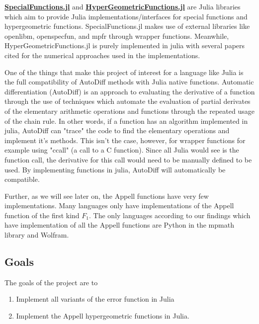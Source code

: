 \documentclass{article}
\theoremstyle{mytheoremstyle}
\theoremstyle{mytheoremstyle}
\theoremstyle{myproblemstyle}
\begin{document}
   \medskip
   \href{https://github.com/JuliaMath/SpecialFunctions.jl}{\textbf{SpecialFunctions.jl}} and \href{https://github.com/JuliaMath/HypergeometricFunctions.jl/issues}{\textbf{HyperGeometricFunctions.jl}} are Julia libraries which aim to provide Julia implementations/interfaces for special functions and hypergeometric functions.
   SpecialFunctions.jl makes use of external libraries like openlibm, openspecfun, and mpfr through wrapper functions.
   Meanwhile, HyperGeometricFunctions.jl is purely implemented in julia with several papers cited for the numerical approaches used in the implementations.

   \medskip
   One of the things that make this project of interest for a language like Julia is the full compatibility of AutoDiff methods with Julia native functions.
   Automatic differentiation (AutoDiff) is an approach to evaluating the derivative of a function through the use of techniques which automate the evaluation of partial derivates of the elementary arithmetic operations and functions through the repeated usage of the chain rule.\cite{autodiff, ForwardDiff.jl}
   In other words, if a function has an algorithm implemented in julia, AutoDiff can "trace" the code to find the elementary operations and implement it's methods. 
   This isn't the case, however, for wrapper functions for example using "ccall" (a call to a C function). 
   Since all Julia would see is the function call, the derivative for this call would need to be manually defined to be used.
   By implementing functions in julia, AutoDiff will automatically be compatible.

   \medskip
   Further, as we will see later on, the Appell functions have very few implementations. 
   Many languages only have implementations of the Appell function of the first kind $F_1$. 
   The only languages according to our findings which have implementation of all the Appell functions are Python in the mpmath\cite{mpmath hypergeometric} library and Wolfram\cite{wolfram hypergeometric}.

    
    \subsection*{Goals}\label{sub:Goals} %
      The goals of the project are to \begin{enumerate}
        \item Implement all variants of the error function in Julia
        \item Implement the Appell hypergeometric functions in Julia. 
      \end{enumerate}  
\end{document}
